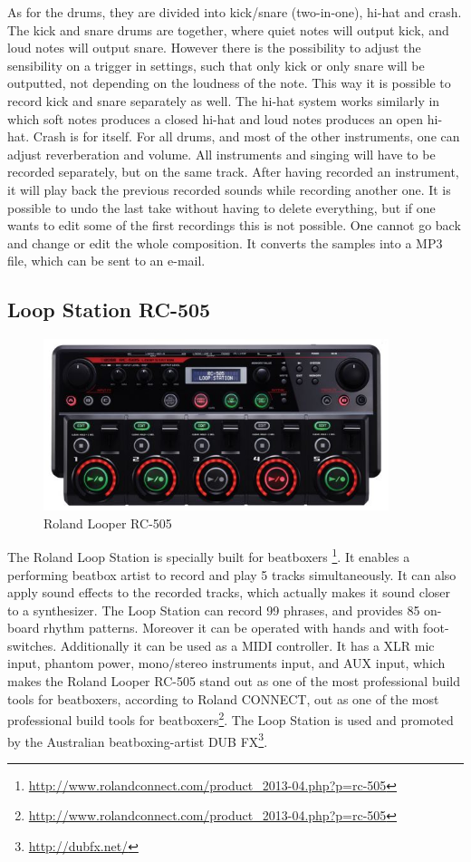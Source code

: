 As for the drums, they are divided into kick/snare (two-in-one), hi-hat and crash. The kick and snare drums are together, where quiet notes will output kick, and loud notes will output snare. However there is the possibility to adjust the sensibility on a trigger in settings, such that only kick or only snare will be outputted, not depending on the loudness of the note. This way it is possible to record kick and snare separately as well. The hi-hat system works similarly in which soft notes produces a closed hi-hat and loud notes produces an open hi-hat. Crash is for itself. For all drums, and most of the other instruments, one can adjust reverberation and volume. 
All instruments and singing will have to be recorded separately, but on the same track. After having recorded an instrument, it will play back the previous recorded sounds while recording another one. It is possible to undo the last take without having to delete everything, but if one wants to edit some of the first recordings this is not possible.  One cannot go back and change or edit the whole composition. It converts the samples into a MP3 file, which can be sent to an e-mail. 

\subsection{ Loop Station RC-505 }
\label{loopstation}
\begin{figure}[h]
	\begin{center}
		\includegraphics[height=5cm]{fig/Roland-RC-505.JPG}
		\caption{Roland Looper RC-505}
		\label{Looper}
	\end{center}
\end{figure}
The Roland Loop Station is specially built for beatboxers \footnote{\url{http://www.rolandconnect.com/product_2013-04.php?p=rc-505}}. It enables a performing beatbox artist to record and play 5 tracks simultaneously. It can also apply sound effects to the recorded tracks, which actually makes it sound closer to a synthesizer. The Loop Station can record 99 phrases, and provides 85 on-board rhythm patterns. Moreover it can be operated with hands and with foot-switches. Additionally it can be used as a MIDI controller. It has a XLR mic input, phantom power, mono/stereo instruments input, and AUX input, which makes the Roland Looper RC-505 stand out as one of the most professional build tools for beatboxers, according to Roland CONNECT, out as one of the most professional build tools for beatboxers\footnote{\url{http://www.rolandconnect.com/product_2013-04.php?p=rc-505}}.
The Loop Station is used and promoted by the Australian beatboxing-artist DUB FX\footnote{\url{http://dubfx.net/}}.